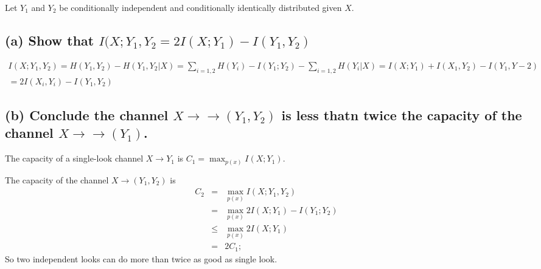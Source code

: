 \documentclass[12pt]{article}
\begin{document}
\begin{tiny}
\begin{multicols}{2}
Let $Y_1$ and $Y_2$ be conditionally independent and conditionally identically distributed given $X$.

\subsection*{(a) Show that $I(X;Y_1, Y_2 = 2I(X;Y_1) - I(Y_1,Y_2)$}
\begin{eqnarray*}
    I(X;Y_1,Y_2) = H(Y_1,Y_2) - H(Y_1,Y_2 | X)
    = \sum_{i=1,2} H(Y_i) - I(Y_1;Y_2) - \sum_{i=1,2} H (Y_i|X)
    =I(X;Y_1) + I(X_1,Y_2) - I(Y_1,Y-2) \\
    =2I(X_i,Y_i) - I(Y_1,Y_2)
\end{eqnarray*}

\subsection*{(b) Conclude the channel $X\rightarrow\rightarrow(Y_1,Y_2)$ is less thatn twice the capacity of the channel $X\rightarrow\rightarrow(Y_1)$.}

The capacity of a single-look channel $X\rightarrow Y_1$ is $C_1 = \max_{p(x)} I(X;Y_1)$.

The capacity of the channel $X \rightarrow (Y_1,Y_2)$ is 
\begin{eqnarray*}
    C_2 
    &=& \max_{p(x)}I(X;Y_1,Y_2) \\
    &=& \max_{p(x)} 2I(X;Y_1) -I(Y_1; Y_2) \\
    &\le& \max_{p(x)}2I(X;Y_1) \\
    &=& 2C_1;
\end{eqnarray*}
So two independent looks can do more than twice as good as single look.

% 
% 

\end{multicols}
\end{tiny}
\end{document}
